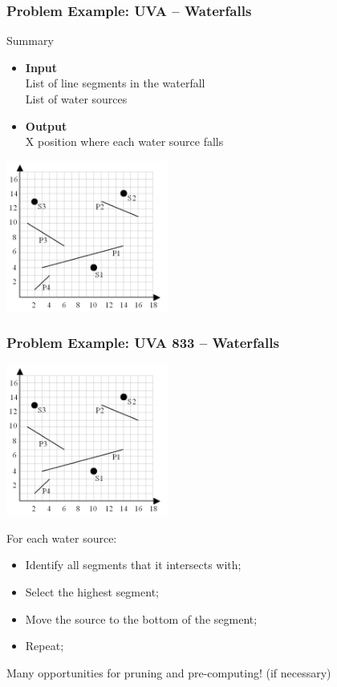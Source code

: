 \documentclass{beamer}
\begin{document}
\begin{frame}
  \frametitle{Problem Example: UVA -- Waterfalls}
  {\small
    \begin{block}{Summary}
      \begin{itemize}
      \item {\bf Input}\\
        List of line segments in the waterfall\\
        List of water sources
      \item {\bf Output}\\
        X position where each water source falls\\
      \end{itemize}
    \end{block}

    \includegraphics[width=0.4\textwidth]{img/waterfall}
  }
\end{frame}
\begin{frame}
  \frametitle{Problem Example: UVA 833 -- Waterfalls}

  \includegraphics[width=0.4\textwidth]{img/waterfall}

  {\smaller
  For each water source:
  \begin{itemize}
  \item Identify all segments that it intersects with;
  \item Select the highest segment;
  \item Move the source to the bottom of the segment;
  \item Repeat;
  \end{itemize}

  \begin{block}{}
    Many opportunities for pruning and pre-computing! (if necessary)
  \end{block}
  }
\end{frame}
\end{document}

